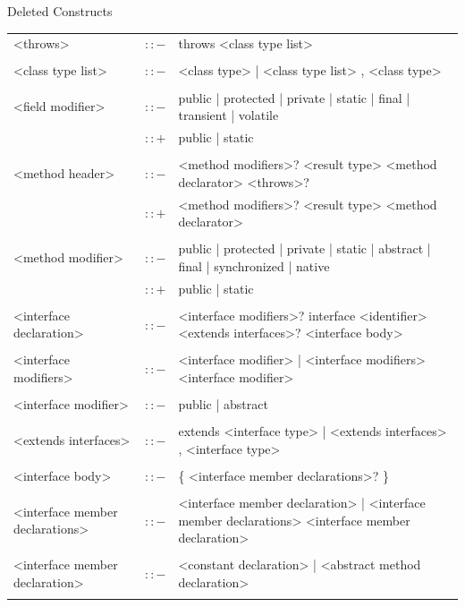 \documentclass[landscape, 11pt]{article}
\begin{document}
\begin{qsection}{Deleted Constructs}
\begin{enumerate}[label=\bt{\theenumi.}]
\begin{longtable}{R{7cm} c L{15cm}}
				<throws>									&	$\colon\colon-$	&	throws <class type list> \\\\
				<class type list>							&	$\colon\colon-$	&	<class type> | <class type list> , <class type> \\\\
				<field modifier>							&	$\colon\colon-$	&	public | protected | private | static | final | transient | volatile \\
															&	$\colon\colon+$	&	public | static \\\\
				<method header>								&	$\colon\colon-$	&	<method modifiers>? <result type> <method declarator> <throws>? \\
															&	$\colon\colon+$	&	<method modifiers>? <result type> <method declarator> \\\\
				<method modifier>							&	$\colon\colon-$	&	public | protected | private | static | abstract | final | synchronized | native \\
															&	$\colon\colon+$	&	public | static \\\\
				<interface declaration>						&	$\colon\colon-$	&	<interface modifiers>? interface <identifier> <extends interfaces>? <interface body> \\\\
				<interface modifiers>						&	$\colon\colon-$	&	<interface modifier> | <interface modifiers> <interface modifier> \\\\
				<interface modifier>						&	$\colon\colon-$	&	public | abstract \\\\
				<extends interfaces>						&	$\colon\colon-$	&	extends <interface type> | <extends interfaces> , <interface type> \\\\
				<interface body>							&	$\colon\colon-$	&	\{ <interface member declarations>? \} \\\\
				<interface member declarations>				&	$\colon\colon-$	&	<interface member declaration> | <interface member declarations> <interface member declaration> \\\\
				<interface member declaration>				&	$\colon\colon-$	&	<constant declaration> | <abstract method declaration> \\\\

\end{longtable}
\end{enumerate}
\end{qsection}
\end{document}
